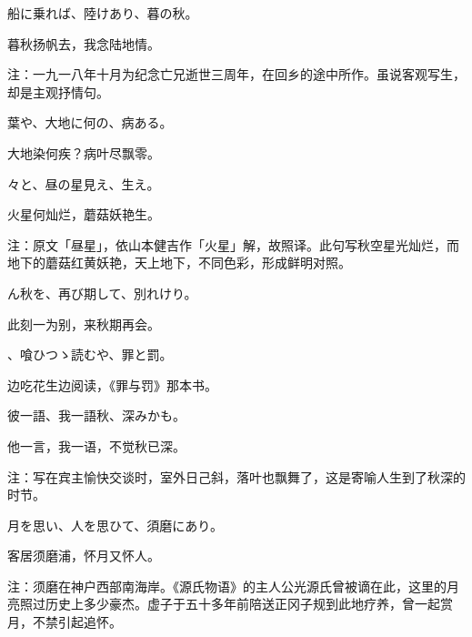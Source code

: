 \begin{haiku}
    {\FH 船に乗れば、陸けあり、暮の秋。}

    {\FK 暮秋扬帆去，我念陆地情。}

    {\FT 注：一九一八年十月为纪念亡兄逝世三周年，在回乡的途中所作。虽说客观写生，却是主观抒情句。}
\end{haiku}

\begin{haiku}
    {\FH {}葉や、大地に何の、病ある。}

    {\FK 大地染何疾？病叶尽飘零。}
\end{haiku}

\begin{haiku}
    {\FH {}々と、昼の星見え、生え。}

    {\FK 火星何灿烂，蘑菇妖艳生。}

    {\FT 注：原文「昼星」，依山本健吉作「火星」解，故照译。此句写秋空星光灿烂，而地下的蘑菇红黄妖艳，天上地下，不同色彩，形成鲜明对照。}
\end{haiku}

\begin{haiku}
    {\FH {}ん秋を、再び期して、別れけり。}

    {\FK 此刻一为别，来秋期再会。}
\end{haiku}

\begin{haiku}
    {\FH {}、喰ひつゝ読むや、罪と罰。}

    {\FK 边吃花生边阅读，《罪与罚》那本书。}
\end{haiku}

\begin{haiku}
    {\FH 彼一語、我一語秋、深みかも。}

    {\FK 他一言，我一语，不觉秋已深。}

    {\FT 注：写在宾主愉快交谈时，室外日己斜，落叶也飘舞了，这是寄喻人生到了秋深的时节。}
\end{haiku}

\begin{haiku}
    {\FH 月を思い、人を思ひて、須磨にあり。}

    {\FK 客居须磨浦，怀月又怀人。}

    {\FT 注：须磨在神户西部南海岸。《源氏物语》的主人公光源氏曾被谪在此，这里的月亮照过历史上多少豪杰。虚子于五十多年前陪送正冈子规到此地疗养，曾一起赏月，不禁引起追怀。}
\end{haiku}

